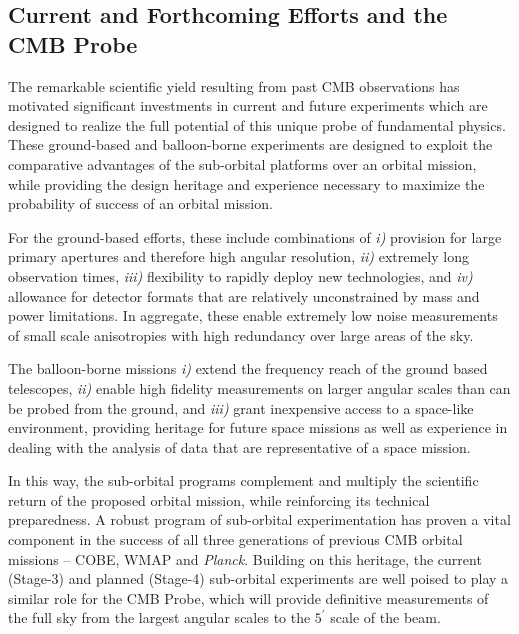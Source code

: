 
\subsection{Current and Forthcoming Efforts and the CMB Probe}
\label{sec:spacemission}

\vspace{-0.05in}

The remarkable scientific yield resulting from past CMB observations
has motivated significant investments in current and future
experiments which are designed to realize the full potential of this
unique probe of fundamental physics.  These ground-based and
balloon-borne experiments are designed to exploit the comparative
advantages of the sub-orbital platforms over an orbital mission, while
providing the design heritage and experience necessary to maximize the
probability of success of an orbital mission.

For the ground-based efforts, these include combinations of {\it i)}
provision for large primary apertures and therefore high angular
resolution, {\it ii)} extremely long observation times, {\it iii)}
flexibility to rapidly deploy new technologies, and {\it iv)}
allowance for detector formats that are relatively unconstrained by
mass and power limitations.  In aggregate, these enable extremely low
noise measurements of small scale anisotropies with high redundancy
over large areas of the sky.

The balloon-borne missions {\it i)} extend the frequency reach of the
ground based telescopes, {\it ii)} enable high fidelity measurements
on larger angular scales than can be probed from the ground, and {\it
  iii)} grant inexpensive access to a space-like environment,
providing heritage for future space missions as well as experience in
dealing with the analysis of data that are representative of a space
mission.

In this way, the sub-orbital programs complement and multiply the
scientific return of the proposed orbital mission, while reinforcing
its technical preparedness.  A robust program of sub-orbital
experimentation has proven a vital component in the success of all
three generations of previous CMB orbital missions -- COBE, WMAP and
{\it Planck}. Building on this heritage, the current (Stage-3) and
planned (Stage-4) sub-orbital experiments are well poised to play a
similar role for the CMB Probe, which will provide definitive
measurements of the full sky from the largest angular scales to the
$5^\prime$ scale of the beam.

